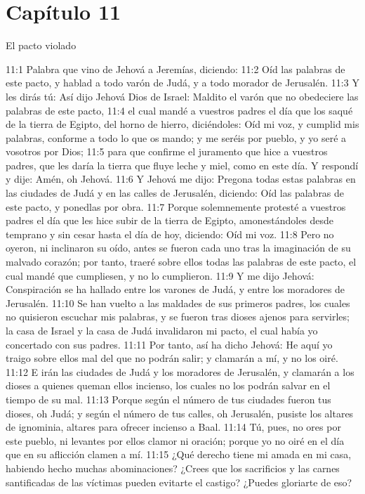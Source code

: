 \section*{Capítulo 11 }
El pacto violado 
 
11:1 Palabra que vino de Jehová a Jeremías, diciendo: 
11:2 Oíd las palabras de este pacto, y hablad a todo varón de Judá, y a todo morador de Jerusalén. 
11:3 Y les dirás tú: Así dijo Jehová Dios de Israel: Maldito el varón que no obedeciere las palabras de este pacto, 
11:4 el cual mandé a vuestros padres el día que los saqué de la tierra de Egipto, del horno de hierro, diciéndoles: Oíd mi voz, y cumplid mis palabras, conforme a todo lo que os mando; y me seréis por pueblo, y yo seré a vosotros por Dios; 
11:5 para que confirme el juramento que hice a vuestros padres, que les daría la tierra que fluye leche y miel, como en este día. Y respondí y dije: Amén, oh Jehová. 
11:6 Y Jehová me dijo: Pregona todas estas palabras en las ciudades de Judá y en las calles de Jerusalén, diciendo: Oíd las palabras de este pacto, y ponedlas por obra. 
11:7 Porque solemnemente protesté a vuestros padres el día que les hice subir de la tierra de Egipto, amonestándoles desde temprano y sin cesar hasta el día de hoy, diciendo: Oíd mi voz. 
11:8 Pero no oyeron, ni inclinaron su oído, antes se fueron cada uno tras la imaginación de su malvado corazón; por tanto, traeré sobre ellos todas las palabras de este pacto, el cual mandé que cumpliesen, y no lo cumplieron. 
11:9 Y me dijo Jehová: Conspiración se ha hallado entre los varones de Judá, y entre los moradores de Jerusalén. 
11:10 Se han vuelto a las maldades de sus primeros padres, los cuales no quisieron escuchar mis palabras, y se fueron tras dioses ajenos para servirles; la casa de Israel y la casa de Judá invalidaron mi pacto, el cual había yo concertado con sus padres. 
11:11 Por tanto, así ha dicho Jehová: He aquí yo traigo sobre ellos mal del que no podrán salir; y clamarán a mí, y no los oiré. 
11:12 E irán las ciudades de Judá y los moradores de Jerusalén, y clamarán a los dioses a quienes queman ellos incienso, los cuales no los podrán salvar en el tiempo de su mal. 
11:13 Porque según el número de tus ciudades fueron tus dioses, oh Judá; y según el número de tus calles, oh Jerusalén, pusiste los altares de ignominia, altares para ofrecer incienso a Baal. 
11:14 Tú, pues, no ores por este pueblo, ni levantes por ellos clamor ni oración; porque yo no oiré en el día que en su aflicción clamen a mí. 
11:15 ¿Qué derecho tiene mi amada en mi casa, habiendo hecho muchas abominaciones? ¿Crees que los sacrificios y las carnes santificadas de las víctimas pueden evitarte el castigo? ¿Puedes gloriarte de eso? 
